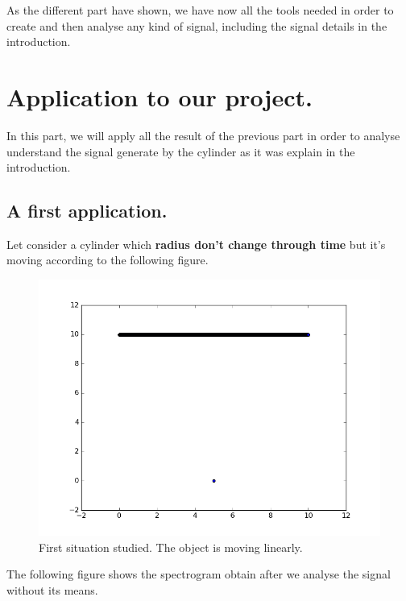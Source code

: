As the different part have shown, we have now all the tools needed in order to create and then analyse any kind of signal, including the signal details in the introduction.

\chapter{Application to our project.}

In this part, we will apply all the result of the previous part in order to analyse understand the signal generate by the cylinder as it was explain in the introduction.

\section{A first application.}

Let consider a cylinder which \textbf{radius don't change through time} but it's moving according to the following figure.

\begin{figure}[H]
\centering
    \includegraphics[scale=0.6,angle=0]{Images/Position.png}
    \caption{First situation studied. The object is moving linearly.}
    \label{fig:moving linearly}
\end{figure}

The following figure shows the spectrogram obtain after we analyse the signal without its means.

